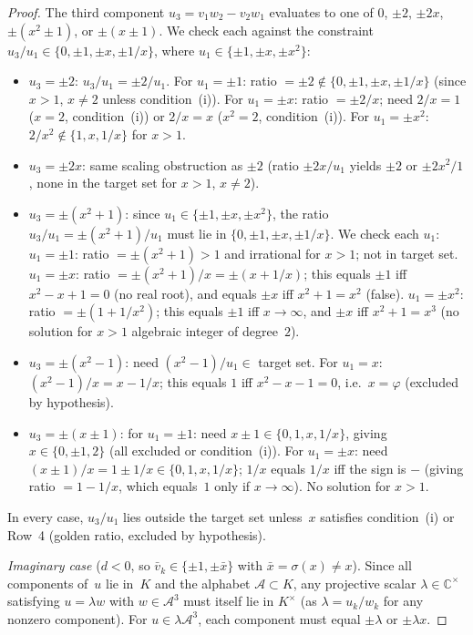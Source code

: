 \documentclass[12pt,a4paper]{article}
\newcommand{\C}{\mathbb{C}}
\begin{document}
\begin{proof}
The third component $u_3 = v_1 w_2 - v_2 w_1$ evaluates to one of
$0$, $\pm 2$, $\pm 2x$, $\pm(x^2 \pm 1)$, or $\pm(x \pm 1)$.
We check each against the constraint $u_3/u_1 \in
\{0, \pm 1, \pm x, \pm 1/x\}$, where $u_1 \in \{\pm 1, \pm x,
\pm x^2\}$:
\begin{itemize}
\item $u_3 = \pm 2$: $u_3/u_1 = \pm 2/u_1$.  For $u_1 = \pm 1$:
  ratio $= \pm 2 \notin \{0, \pm 1, \pm x, \pm 1/x\}$ (since
  $x > 1$, $x \neq 2$ unless condition~(i)).  For $u_1 = \pm x$:
  ratio $= \pm 2/x$; need $2/x = 1$ ($x = 2$, condition~(i)) or
  $2/x = x$ ($x^2 = 2$, condition~(i)).  For $u_1 = \pm x^2$:
  $2/x^2 \notin \{1, x, 1/x\}$ for $x > 1$.
\item $u_3 = \pm 2x$: same scaling obstruction as $\pm 2$
  (ratio $\pm 2x/u_1$ yields $\pm 2$ or $\pm 2x^2/1$, none in
  the target set for $x > 1$, $x \neq 2$).
\item $u_3 = \pm(x^2 + 1)$: since $u_1 \in \{\pm 1, \pm x,
  \pm x^2\}$, the ratio $u_3/u_1 = \pm(x^2 + 1)/u_1$ must lie in
  $\{0, \pm 1, \pm x, \pm 1/x\}$.  We check each $u_1$:
  $u_1 = \pm 1$: ratio $= \pm(x^2 + 1) > 1$ and irrational for
  $x > 1$; not in target set.
  $u_1 = \pm x$: ratio $= \pm(x^2 + 1)/x = \pm(x + 1/x)$; this
  equals $\pm 1$ iff $x^2 - x + 1 = 0$ (no real root), and
  equals $\pm x$ iff $x^2 + 1 = x^2$ (false).
  $u_1 = \pm x^2$: ratio $= \pm(1 + 1/x^2)$; this equals $\pm 1$
  iff $x \to \infty$, and $\pm x$ iff $x^2 + 1 = x^3$
  (no solution for $x > 1$ algebraic integer of degree~$2$).
\item $u_3 = \pm(x^2 - 1)$: need $(x^2 - 1)/u_1 \in$ target set.
  For $u_1 = x$: $(x^2 - 1)/x = x - 1/x$; this equals $1$ iff
  $x^2 - x - 1 = 0$, i.e.\ $x = \varphi$ (excluded by hypothesis).
\item $u_3 = \pm(x \pm 1)$: for $u_1 = \pm 1$: need
  $x \pm 1 \in \{0, 1, x, 1/x\}$, giving $x \in \{0, \pm 1, 2\}$
  (all excluded or condition~(i)).  For $u_1 = \pm x$: need
  $(x \pm 1)/x = 1 \pm 1/x \in \{0, 1, x, 1/x\}$; $1/x$ equals
  $1/x$ iff the sign is $-$ (giving ratio $= 1 - 1/x$, which
  equals~$1$ only if $x \to \infty$).  No solution for $x > 1$.
\end{itemize}
In every case, $u_3/u_1$ lies outside the target set unless~$x$
satisfies condition~(i) or Row~4 (golden ratio, excluded by
hypothesis).

\emph{Imaginary case} ($d < 0$, so $\bar{v}_k \in \{\pm 1,
\pm\bar{x}\}$ with $\bar{x} = \sigma(x) \neq x$).
Since all components of~$u$ lie in~$K$ and the alphabet
$\mathcal{A} \subset K$, any projective scalar $\lambda \in \C^\times$
satisfying $u = \lambda w$ with $w \in \mathcal{A}^3$ must itself lie
in $K^\times$ (as $\lambda = u_k / w_k$ for any nonzero component).
For $u \in \lambda\mathcal{A}^3$, each component must equal
$\pm\lambda$ or $\pm\lambda x$.


\end{proof}
\end{document}
